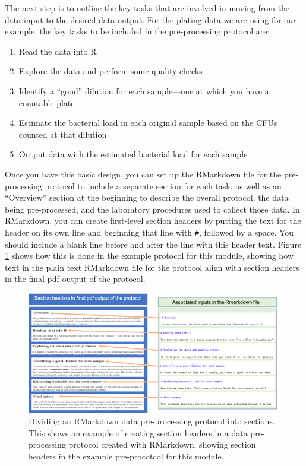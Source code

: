 \documentclass[]{tufte-book}
\providecommand{\tightlist}{%
  \setlength{\itemsep}{0pt}\setlength{\parskip}{0pt}}
\begin{document}
The next step is to outline the key tasks that are involved in moving from the
data input to the desired data output. For the plating data we are using for our
example, the key tasks to be included in the pre-processing protocol are:

\begin{enumerate}
\def\labelenumi{\arabic{enumi}.}
\tightlist
\item
  Read the data into R
\item
  Explore the data and perform some quality checks
\item
  Identify a ``good'' dilution for each sample---one at which you have a
  countable plate
\item
  Estimate the bacterial load in each original sample based on the CFUs counted
  at that dilution
\item
  Output data with the estimated bacterial load for each sample
\end{enumerate}

Once you have this basic design, you can set up the RMarkdown file for the
pre-processing protocol to include a separate section for each task, as well as
an ``Overview'' section at the beginning to describe the overall protocol, the
data being pre-processed, and the laboratory procedures used to collect those
data. In RMarkdown, you can create first-level section headers by putting the
text for the header on its own line and beginning that line with \texttt{\#}, followed
by a space. You should include a blank line before and after the line with this
header text. Figure \ref{fig:protocolsections} shows how this is done in the
example protocol for this module, showing how text in the plain text RMarkdown
file for the protocol align with section headers in the final pdf output of the
protocol.

\begin{figure}
\includegraphics[width=\textwidth]{figures/protocol_sections} \caption[Dividing an RMarkdown data pre-processing protocol into sections]{Dividing an RMarkdown data pre-processing protocol into sections. This shows an example of creating section headers in a data pre-processing protocol created with RMarkdown, showing section headers in the example pre-procotcol for this module.}\label{fig:protocolsections}
\end{figure}
\end{document}

